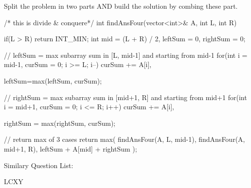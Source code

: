     

\begin{solution}
    Split the problem in two parts AND build the solution by combing these part.
    
    \begin{code}
    /* this is divide & conquere*/
    int findAnsFour(vector<int>& A, int L, int R){
        if(L > R) return INT_MIN;
        int mid = (L + R) / 2, leftSum = 0, rightSum = 0;

        // leftSum = max subarray sum in [L, mid-1] and starting from mid-1
        for(int i = mid-1, curSum = 0; i >= L; i--)
            curSum += A[i],
        
        leftSum=max(leftSum, curSum);

        // rightSum = max subarray sum in [mid+1, R] and starting from mid+1
        for(int i = mid+1, curSum = 0; i <= R; i++)
            curSum += A[i],
        
        rightSum = max(rightSum, curSum);        

        // return max of 3 cases 
        return max({ findAnsFour(A, L, mid-1), findAnsFour(A, mid+1, R), leftSum + A[mid] + rightSum });
    }	
    \end{code}
\end{solution}


Similary Question List:
\begin{asparaenum}[(a)]
    \item LCXY
\end{asparaenum}